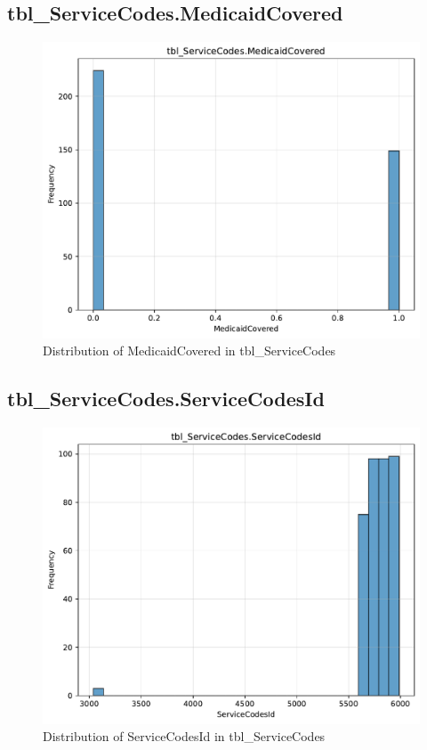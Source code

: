 \subsection{tbl\_ServiceCodes.MedicaidCovered}

\begin{figure}[htbp]
\centering
\includegraphics[width=\textwidth]{figures/dbo_tbl_ServiceCodes_MedicaidCovered.pdf}
\caption{Distribution of MedicaidCovered in tbl\_ServiceCodes}
\end{figure}\newpage

\subsection{tbl\_ServiceCodes.ServiceCodesId}

\begin{figure}[htbp]
\centering
\includegraphics[width=\textwidth]{figures/dbo_tbl_ServiceCodes_ServiceCodesId.pdf}
\caption{Distribution of ServiceCodesId in tbl\_ServiceCodes}
\end{figure}\newpage

